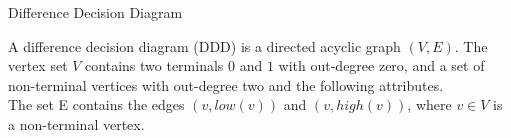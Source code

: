 \begin{frame}{Difference Decision Diagram}
\begin{mydef}
A difference decision diagram (DDD) is a directed acyclic graph $(V,E)$. The vertex set $V$ contains two terminals $0$ and $1$ with out-degree zero, and a set of non-terminal vertices with out-degree two and the following attributes.
\\
The set E contains the edges $(v,low(v))$ and $(v, high(v))$, where $v \in V$ is a non-terminal vertex.
\end{mydef}
\end{frame}

